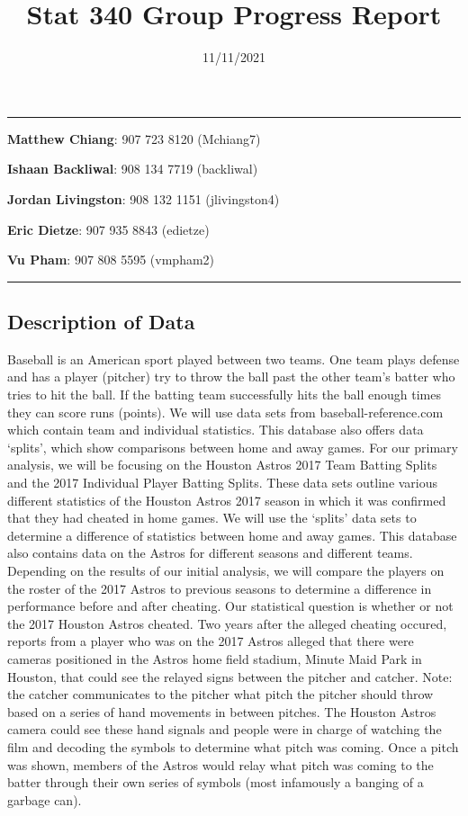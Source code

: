 \documentclass[
]{article}
\title{Stat 340 Group Progress Report}
\author{}
\date{\vspace{-2.5em}11/11/2021}
\begin{document}
\maketitle

\begin{center}\rule{0.5\linewidth}{0.5pt}\end{center}

\textbf{Matthew Chiang}: 907 723 8120 (Mchiang7)

\textbf{Ishaan Backliwal}: 908 134 7719 (backliwal)

\textbf{Jordan Livingston}: 908 132 1151 (jlivingston4)

\textbf{Eric Dietze}: 907 935 8843 (edietze)

\textbf{Vu Pham}: 907 808 5595 (vmpham2)

\begin{center}\rule{0.5\linewidth}{0.5pt}\end{center}

\hypertarget{description-of-data}{%
\subsection{Description of Data}\label{description-of-data}}

Baseball is an American sport played between two teams. One team plays
defense and has a player (pitcher) try to throw the ball past the other
team's batter who tries to hit the ball. If the batting team
successfully hits the ball enough times they can score runs (points). We
will use data sets from baseball-reference.com which contain team and
individual statistics. This database also offers data `splits', which
show comparisons between home and away games. For our primary analysis,
we will be focusing on the Houston Astros 2017 Team Batting Splits and
the 2017 Individual Player Batting Splits. These data sets outline
various different statistics of the Houston Astros 2017 season in which
it was confirmed that they had cheated in home games. We will use the
`splits' data sets to determine a difference of statistics between home
and away games. This database also contains data on the Astros for
different seasons and different teams. Depending on the results of our
initial analysis, we will compare the players on the roster of the 2017
Astros to previous seasons to determine a difference in performance
before and after cheating. Our statistical question is whether or not
the 2017 Houston Astros cheated. Two years after the alleged cheating
occured, reports from a player who was on the 2017 Astros alleged that
there were cameras positioned in the Astros home field stadium, Minute
Maid Park in Houston, that could see the relayed signs between the
pitcher and catcher. Note: the catcher communicates to the pitcher what
pitch the pitcher should throw based on a series of hand movements in
between pitches. The Houston Astros camera could see these hand signals
and people were in charge of watching the film and decoding the symbols
to determine what pitch was coming. Once a pitch was shown, members of
the Astros would relay what pitch was coming to the batter through their
own series of symbols (most infamously a banging of a garbage can).
\end{document}
